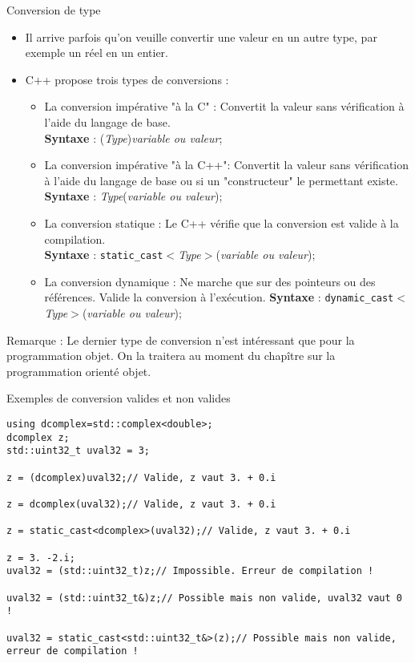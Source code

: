 \documentclass[compress,10pt,aspectratio=169]{beamer}
\begin{document}
\begin{frame}[fragile]{Conversion de type}
\scriptsize
  
\begin{itemize}
\item Il arrive parfois qu'on veuille convertir une valeur en un autre type, par exemple un réel en un entier.
\item C++ propose trois types de conversions :
\begin{itemize}
\scriptsize
\item La conversion impérative "à la C"  : Convertit la valeur sans vérification à l'aide du langage de base.\\
\textcolor{NavyBlue}{\textbf{Syntaxe} : (\textsl{Type})\textsl{variable ou valeur}};\\[1mm]
\item La conversion impérative "à la C++": Convertit la valeur sans vérification à l'aide du langage de base ou si un "constructeur" le permettant existe.\\
\textcolor{NavyBlue}{\textbf{Syntaxe} : \textsl{Type}(\textsl{variable ou valeur})};\\[1mm]
\item La conversion statique   : Le C++ vérifie que la conversion est valide à la compilation.\\ 
\textcolor{NavyBlue}{\textbf{Syntaxe} : 
\texttt{static\_cast}$<$\textsl{Type}$>$(\textsl{variable ou valeur})};\\[1mm]
\item La conversion dynamique  : Ne marche que sur des pointeurs ou des références. Valide la conversion à l'exécution.
\textcolor{NavyBlue}{\textbf{Syntaxe} : \texttt{dynamic\_cast}$<$\textsl{Type}$>$(\textsl{variable ou valeur});}
\end{itemize}
\end{itemize}
  
\alert{Remarque} : Le dernier type de conversion n'est intéressant que pour la programmation objet. On la traitera au moment du chapître sur la 
programmation orienté objet.
  
\end{frame}
  
\begin{frame}[fragile]{Exemples de conversion valides et non valides}
  
\begin{verbatim}
using dcomplex=std::complex<double>;
dcomplex z;
std::uint32_t uval32 = 3;
  
z = (dcomplex)uval32;// Valide, z vaut 3. + 0.i
  
z = dcomplex(uval32);// Valide, z vaut 3. + 0.i
  
z = static_cast<dcomplex>(uval32);// Valide, z vaut 3. + 0.i
  
z = 3. -2.i;
uval32 = (std::uint32_t)z;// Impossible. Erreur de compilation !
  
uval32 = (std::uint32_t&)z;// Possible mais non valide, uval32 vaut 0 !
  
uval32 = static_cast<std::uint32_t&>(z);// Possible mais non valide, erreur de compilation !
\end{verbatim}
\end{frame}
\end{document}
